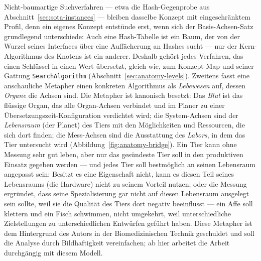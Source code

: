 \begin{nurlang}
Nicht-baumartige Suchverfahren --- etwa die Hash-Gegenprobe aus Abschnitt~\ref{sec:sota-instances} ---
bleiben dasselbe Konzept mit eingeschränktem Profil, denn ein eigenes Konzept entstünde erst, wenn sich
der Basis-Achsen-Satz grundlegend unterschiede: Auch eine Hash-Tabelle ist ein Baum, der von der Wurzel
seines Interfaces über eine Auffächerung an Hashes sucht --- nur der Kern-Algorithmus des Knotens ist ein
anderer. Deshalb gehört jedes Verfahren, das einen Schlüssel in einen Wert übersetzt, gleich wie, zum
Konzept Map und seiner Gattung \texttt{SearchAlgorithm} (Abschnitt~\ref{sec:anatomy-levels}). Zweitens
fasst eine anschauliche Metapher einen konkreten Algorithmus als \emph{Lebewesen} auf, dessen
\emph{Organe} die Achsen sind. Die Metapher ist kanonisch besetzt: Das \emph{Blut} ist das flüssige
Organ, das alle Organ-Achsen verbindet und im Planer zu einer Übersetzungszeit-Konfiguration verdichtet
wird; die System-Achsen sind der \emph{Lebensraum} (der Planet) des Tiers mit den Möglichkeiten und
Ressourcen, die sich dort finden; die Mess-Achsen sind die Ausstattung des \emph{Labors}, in dem das
Tier untersucht wird (Abbildung~\ref{fig:anatomy-bridge}). Ein Tier kann ohne Messung sehr gut leben,
aber nur das gesündeste Tier soll in den produktiven Einsatz gegeben werden --- und jedes Tier soll
bestmöglich an seinen Lebensraum angepasst sein: Besitzt es eine Eigenschaft nicht, kann es diesen Teil
seines Lebensraums (die Hardware) nicht zu seinem Vorteil nutzen; oder die Messung ergründet, dass seine
Spezialisierung gar nicht auf diesen Lebensraum ausgelegt sein sollte, weil sie die Qualität des Tiers
dort negativ beeinflusst --- ein Affe soll klettern und ein Fisch schwimmen, nicht umgekehrt, weil
unterschiedliche Zielstellungen zu unterschiedlichen Entwürfen geführt haben. Diese Metapher ist dem
Hintergrund des Autors in der Biomedizinischen Technik geschuldet und soll die Analyse durch
Bildhaftigkeit vereinfachen; ab hier arbeitet die Arbeit durchgängig mit diesem Modell.
\end{nurlang}
